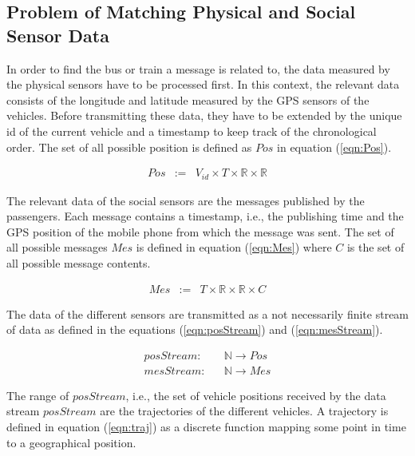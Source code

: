 \subsection{Problem of Matching Physical and Social Sensor Data}\label{sec:problem}

In order to find the bus or train a message is related to, the data measured by the physical sensors have to be processed first. In this context, the relevant data consists of the longitude and latitude measured by the GPS sensors of the vehicles. Before transmitting these data, they have to be extended by the unique id of the current vehicle and a timestamp to keep track of the chronological order. The set of all possible position is defined as $Pos$ in equation (\ref{eqn:Pos}).

\vspace*{-2\baselineskip}
\begin{eqnarray}
 Pos & := & V_{id} \times T \times \mathbb{R} \times \mathbb{R}\label{eqn:Pos}
\end{eqnarray}

The relevant data of the social sensors are the messages published by the passengers. Each message contains a timestamp, i.e., the publishing time and the GPS position of the mobile phone from which the message was sent. The set of all possible messages $Mes$ is defined in equation (\ref{eqn:Mes}) where $C$ is the set of all possible message contents.

\vspace*{-2\baselineskip}
\begin{eqnarray}
 Mes & := & T \times \mathbb{R} \times \mathbb{R} \times C\label{eqn:Mes}
\end{eqnarray}

The data of the different sensors are transmitted as a not necessarily finite stream of data as defined in the equations (\ref{eqn:posStream}) and (\ref{eqn:mesStream}).

\vspace*{-2\baselineskip}
\begin{eqnarray}
 posStream: &  & \mathbb{N} \rightarrow Pos\label{eqn:posStream}\\
 mesStream: &  & \mathbb{N} \rightarrow Mes\label{eqn:mesStream}
\end{eqnarray}

The range of $posStream$, i.e., the set of vehicle positions received by the data stream $posStream$ are the trajectories of the different vehicles. A trajectory is defined in equation (\ref{eqn:traj}) as a discrete function mapping some point in time to a geographical position.

